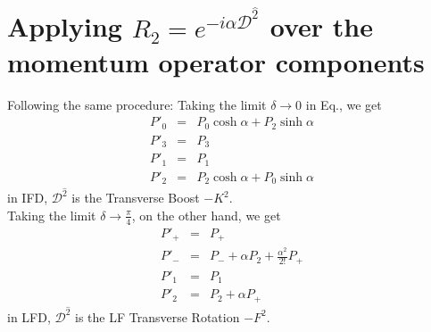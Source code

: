 \documentclass[]{article}
\numberwithin{equation}{section}
\def\bea{\begin{eqnarray}}
\def\eea{\end{eqnarray}}
\def\wh{\widehat}
\begin{document}
{{\section{Applying $R_2 = e^{-i\alpha {\mathcal D}^{\wh{2}} }$ over the momentum operator components}
Following the same procedure:
Taking the limit $\delta \rightarrow 0$ in Eq., we get
\bea
\label{T3IFD}
P'_{0} & = & P_{0} \cosh{\alpha}+P_2\sinh{\alpha}
\nonumber\\ 
P'_{3} & = & {P}_{3}
\nonumber\\
P'_{1} & = & P_{1} \nonumber\\
P'_{2} & = & P_{2} \cosh{\alpha}+P_0\sinh{\alpha} \nonumber
\eea
in IFD, $\mathcal{D}^{\hat{2}}$ is the  Transverse Boost  $-K^2$.\\
%
Taking the limit $\delta \rightarrow \frac{\pi}{4}$, on the other hand, we get
\bea
\label{T3LFD}
P'_{+} & = & P_{+}
\nonumber\\ 
P'_{-} & = & P_{-}+\alpha P_2+\frac{\alpha^2}{2!}P_+
\nonumber\\
P'_{{1}} & = & {P}_{{1}} \nonumber\\
P'_{{2}} & = & {P}_{{2}}+\alpha P_{+} \nonumber
\eea
in LFD, $\mathcal{D}^{\hat{2}}$ is the LF Transverse Rotation  $-F^2$.
}}
\end{document}

